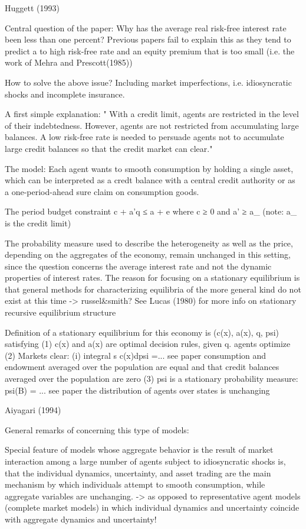 Huggett (1993)

Central question of the paper: Why has the average real risk-free interest rate been less than one percent? 
	Previous papers fail to explain this as they tend to predict a to high risk-free rate and an equity premium that is too small (i.e. the work of Mehra and Prescott(1985))

How to solve the above issue?
	Including market imperfections, i.e. idiosyncratic shocks and incomplete insurance. 

A first simple explanation:
	" With a credit limit, agents are restricted in the level of their indebtedness. However, agents are not restricted from accumulating large balances. A low risk-free rate is needed to persuade agents not to accumulate large credit balances so that the credit market can clear."


The model:
	Each agent wants to smooth consumption by holding a single asset, which can be interpreted as a credt balance with a central credit authority or as a one-period-ahead sure claim on consumption goods. 

	The period budget constraint
		c + a'q ≤ a + e where c ≥ 0 and a' ≥ a_  (note: a_ is the credit limit)

	The probability measure used to describe the heterogeneity as well as the price, depending on the aggregates of the economy, remain unchanged in this setting, since the question concerns the average interest rate and not the dynamic properties of interest rates. 
		The reason for focusing on a stationary equilibrium is that general methods for characterizing equilibria of the more general kind do not exist at this time -> russel&smith?
	See Lucas (1980) for more info on stationary recursive equilibrium structure 

	Definition of a stationary equilibrium for this economy is (c(x), a(x), q, psi) satisfying
		(1) c(x) and a(x) are optimal decision rules, given q.
			agents optimize
		(2) Markets clear: (i) integral s c(x)dpsi =... see paper 
			consumption and endowment averaged over the population are equal and that credit balances averaged over the population are zero
		(3) psi is a stationary probability measure: psi(B) = ... see paper 
			the distribution of agents over states is unchanging 


Aiyagari (1994) 

General remarks of concerning this type of models: 

Special feature of models whose aggregate behavior is the result of market interaction among a large number of agents subject to idiosyncratic shocks is, that the individual dynamics, uncertainty, and asset trading  are the main mechanism by which individuals attempt to smooth consumption, while aggregate variables are unchanging. 
	-> as opposed to representative agent models (complete market models) in which individual dynamics and uncertainty coincide with aggregate dynamics and uncertainty!

